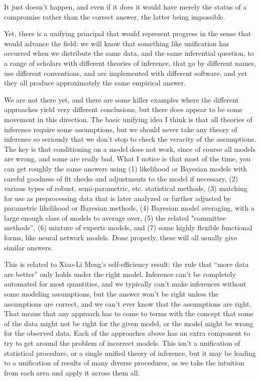 It just doesn't happen, and even if it does it would have merely the
status of a compromise rather than the correct answer, the latter
being impossible.

Yet, there is a unifying principal that would represent progress in
the sense that would advance the field: we will know that something
like unification has occurred when we distribute the same data, and
the same inferential question, to a range of scholars with different
theories of inference, that go by different names, use different
conventions, and are implemented with different software, and yet they
all produce approximately the same empirical answer.

We are not there yet, and there are some killer examples where the
different approaches yield very different conclusions, but there does
appear to be some movement in this direction. The basic unifying idea
I think is that all theories of inference require some assumptions,
but we should never take any theory of inference so seriously that we
don't stop to check the veracity of the assumptions. The key is that
conditioning on a model does not work, since of course all models are
wrong, and some are really bad. What I notice is that most of the
time, you can get roughly the same answers using (1) likelihood or
Bayesian models with careful goodness of fit checks and adjustments to
the model if necessary, (2) various types of robust, semi-parametric,
etc. statistical methods, (3) matching for use as preprocessing data
that is later analyzed or further adjusted by parametric likelihood or
Bayesian methods, (4) Bayesian model averaging, with a large enough
class of models to average over, (5) the related "committee methods'',
(6) mixture of experts models, and (7) some highly flexible functional
forms, like neural network models. Done properly, these will all
usually give similar answers.

This is related to Xiao-Li Meng's self-efficiency result: the rule
that ``more data are better'' only holds under the right model.
Inference can't be completely automated for most quantities, and we
typically can't make inferences without some modeling assumptions, but
the answer won't be right unless the assumptions are correct, and we
can't ever know that the assumptions are right. That means that any
approach has to come to terms with the concept that some of the data
might not be right for the given model, or the model might be wrong
for the observed data. Each of the approaches above has an extra
component to try to get around the problem of incorrect models. This
isn't a unification of statistical procedure, or a single unified
theory of inference, but it may be leading to a unification of
results of many diverse procedures, as we take the intuition from each
area and apply it across them all.

